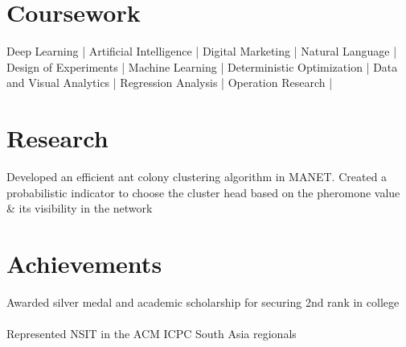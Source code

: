 \documentclass[]{resume-openfont}
\begin{document}
\begin{minipage}[t]{0.33\textwidth}

\section{Coursework}
Deep Learning | Artificial Intelligence | 
Digital Marketing |
Natural Language | 
Design of Experiments | 
Machine Learning | 
Deterministic Optimization |
Data and Visual Analytics | 
Regression Analysis |
Operation Research | 
\sectionsep



\section{Research}
Developed an efficient ant colony clustering algorithm in MANET. Created a probabilistic indicator to choose the cluster head based on the pheromone value \& its visibility in the network
\sectionsep

\section{Achievements}
\runsubsection{}
\vspace{\topsep} 
Awarded silver medal and academic scholarship for securing 2nd rank in college \\
\\\vspace{\topsep} 
Represented NSIT in the ACM ICPC South Asia regionals
\sectionsep


%
%

\end{minipage} 
\hfill
\end{document}
